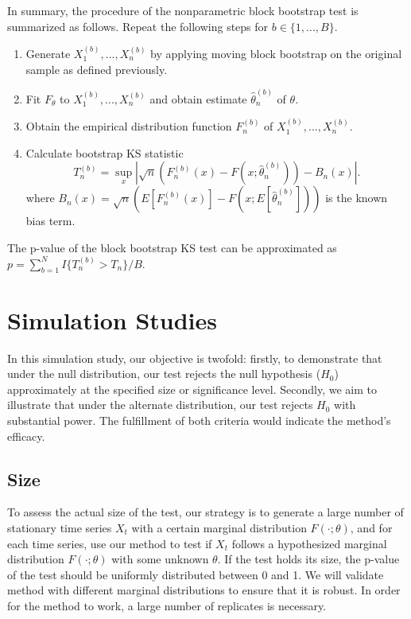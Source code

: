 \documentclass[12pt, titlepage, letterpaper]{article}
\begin{document}
In summary, the procedure of the nonparametric block bootstrap test is 
summarized as follows. Repeat the following steps for $b \in \{1, ..., B\}$.
\begin{enumerate}
\item
  Generate $X^{(b)}_1,...,X^{(b)}_n$ by applying moving block bootstrap 
  on the original sample as
  defined previously.
\item
  Fit $F_\theta$ to $X^{(b)}_1,...,X^{(b)}_n$ and obtain estimate 
	$\hat\theta^{(b)}_n$ of $\theta$.
\item
  Obtain the empirical distribution function $F^{(b)}_n$ of
  $X^{(b)}_1,...,X^{(b)}_n$. 
\item
  Calculate bootstrap KS statistic
  \[
    T^{(b)}_n = \sup_x | \sqrt{n}\left(F^{(b)}_n(x) 
    - F(x; \hat\theta^{(b)}_n)\right) - B_n(x) |.
  \]
  where 
  $B_{n}(x) = \sqrt{n}(E[F^{(b)}_n(x)] - 
  F(x; E[\hat\theta^{(b)}_n]))$ is the known
  bias term.
\end{enumerate}


The p-value of the block bootstrap KS test can be approximated
as $p = \sum_{b=1}^N I\{T^{(b)}_n > T_n\} / B$.


\section{Simulation Studies}
\label{sec:simu}

In this simulation study, our objective is twofold: firstly, to demonstrate that
under the null distribution, our test rejects the null hypothesis ($H_0$) 
approximately at the specified size or significance level. Secondly, we aim to
illustrate that under the alternate distribution, our test rejects
$H_0$ with substantial power. The fulfillment of both criteria would indicate
the method's efficacy.


\subsection{Size}
To assess the actual size of the test, our strategy is to
generate a large number of stationary time series $X_t$ with a certain marginal
distribution $F(\cdot; \theta)$, and for each time series, use our method to
test if $X_t$ follows a hypothesized marginal distribution $F(\cdot; \theta)$
with some unknown $\theta$. If the test holds its size, the p-value
of the test should be uniformly distributed between 0 and 1. We will validate
method with different marginal distributions to ensure that it is robust.
In order for the method to work, a large number of replicates is necessary. 
\end{document}
